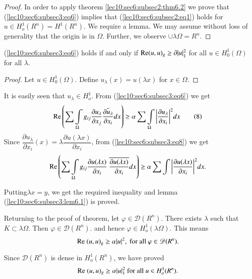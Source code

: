 \begin{proof}%
  In order to apply theorem \ref{lec10:sec6:subsec2:thm6.2} we prove that (\ref{lec10:sec6:subsec3:eq6}) implies that (\ref{lec10:sec6:subsec2:eq1})
  holds for $u \in H^1_o (R^n) = H^1 (R^n)$. We require a
  lemma. We may assume without loss of generality that the origin is in
  $\Omega$. Further, we observe $\cup \lambda \Omega = R^n$. 
\end{proof}

\begin{lemma}\label{lec10:sec6:subsec3:lem6.1}
  (\ref{lec10:sec6:subsec3:eq6}) holds if and only if $\operatorname{Re}  (u, u)_g \geq \partial |u|^2_1$ for
  all $ u \in H^1 _0 (\Omega) $ for all $\lambda$.  
\end{lemma}

\begin{proof}
  Let $u \in H^1_0(\Omega)$. Define $u_\lambda (x) = u(\lambda
  x)$ for $x \in \Omega$.  
\end{proof}

It is easily seen that $u_\lambda \in H^1_o$. From (\ref{lec10:sec6:subsec3:eq6}) we get 
\begin{equation*}
\operatorname{Re}  \left( \sum\int\limits_\Omega g _{ij} \frac{\partial
  u_\lambda}{\partial x_j}\frac{\bar{\partial u_\lambda}}{\partial
  x_i}  dx\right) \geq \alpha \sum\int\limits_\Omega \bigg|  \frac{\partial
  u_\lambda}{\partial x_i}\bigg|^2 dx \tag{8}\label{lec10:sec6:subsec3:eq8} 
\end{equation*}
Since $\dfrac{\partial u_\lambda }{\partial x_i}(x) = \lambda
\dfrac{\partial u(\lambda x)}{\partial x_i}$, from (\ref{lec10:sec6:subsec3:eq8}) we get  
$$
\operatorname{Re}  \left(\sum \int\limits_\Omega g_{ij} \frac{\partial u ( \lambda
  x)}{\partial x_i} ~ \overline{\frac{\partial u (\lambda x)}{\partial x_i}}dx\right)\geq \alpha \sum \int \bigg| \frac{\partial u
  (\lambda x)}{\partial x_i}\bigg|^2 dx. 
$$

Putting\pageoriginale $\lambda x = y$, we get the required inequality and lemma
(\ref{lec10:sec6:subsec3:lem6.1}) is proved. 

Returning to the proof of theorem, let $\varphi \in
\mathscr{D}(R^n)$. There exists $\lambda $ such that $K \subset
\lambda \Omega$. Then $\varphi \in \mathscr{D}(R^n)$. and
hence $\varphi \in H^1_o(\lambda \Omega)$. This means  
$$
\operatorname{Re}  ~(u, u)_g \geq \alpha |u|^2, \text{ for all } \varphi \in
\mathscr{D} (R^n). 
$$

Since $\mathscr{D}(R^n)$ is dense in $H^1_o (R^n)$, we have proved 
$$
\operatorname{Re} ~ (u, u)_g \geq \alpha |u|^2_1 \text{ for all } u \in H^1_o (R^n).
$$

